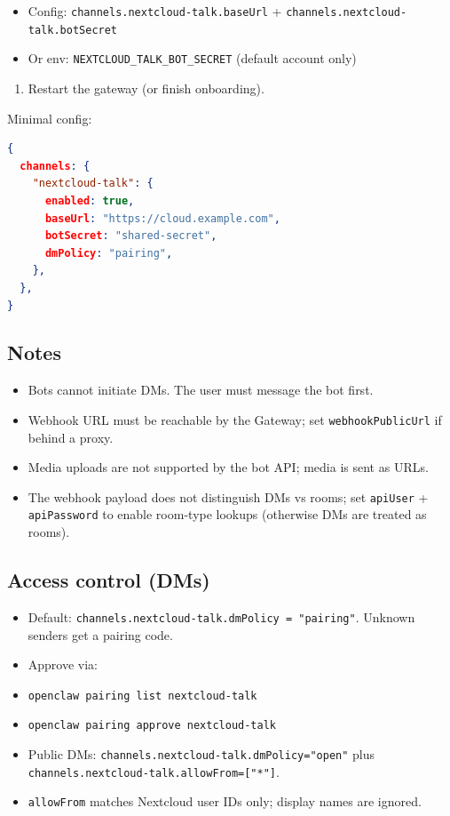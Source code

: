 \begin{itemize}
  \item Config: \texttt{channels.nextcloud-talk.baseUrl} + \texttt{channels.nextcloud-talk.botSecret}
  \item Or env: \texttt{NEXTCLOUD\_TALK\_BOT\_SECRET} (default account only)
\end{itemize}

\begin{enumerate}
  \item Restart the gateway (or finish onboarding).
\end{enumerate}


Minimal config:

\begin{lstlisting}[language=json]
{
  channels: {
    "nextcloud-talk": {
      enabled: true,
      baseUrl: "https://cloud.example.com",
      botSecret: "shared-secret",
      dmPolicy: "pairing",
    },
  },
}
\end{lstlisting}


\subsection{Notes}


\begin{itemize}
  \item Bots cannot initiate DMs. The user must message the bot first.
  \item Webhook URL must be reachable by the Gateway; set \texttt{webhookPublicUrl} if behind a proxy.
  \item Media uploads are not supported by the bot API; media is sent as URLs.
  \item The webhook payload does not distinguish DMs vs rooms; set \texttt{apiUser} + \texttt{apiPassword} to enable room-type lookups (otherwise DMs are treated as rooms).
\end{itemize}


\subsection{Access control (DMs)}


\begin{itemize}
  \item Default: \texttt{channels.nextcloud-talk.dmPolicy = "pairing"}. Unknown senders get a pairing code.
  \item Approve via:
  \item \texttt{openclaw pairing list nextcloud-talk}
  \item \texttt{openclaw pairing approve nextcloud-talk }
  \item Public DMs: \texttt{channels.nextcloud-talk.dmPolicy="open"} plus \texttt{channels.nextcloud-talk.allowFrom=["*"]}.
  \item \texttt{allowFrom} matches Nextcloud user IDs only; display names are ignored.
\end{itemize}


